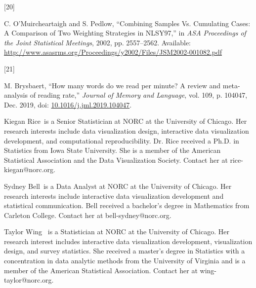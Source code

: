 \documentclass{IEEEcsmag}
\newlength{\cslhangindent}
\newlength{\csllabelwidth}
\newenvironment{CSLReferences}[2] %
 {\begin{list}{}{%
  \setlength{\itemindent}{0pt}
  \setlength{\leftmargin}{0pt}
  \setlength{\parsep}{0pt}
  \ifodd #1
   \setlength{\leftmargin}{\cslhangindent}
   \setlength{\itemindent}{-1\cslhangindent}
  \fi
  \setlength{\itemsep}{#2\baselineskip}}}
 {\end{list}}
\newcommand{\CSLLeftMargin}[1]{\parbox[t]{\csllabelwidth}{#1}}
\newcommand{\CSLRightInline}[1]{\parbox[t]{\linewidth - \csllabelwidth}{#1}\break}
\begin{document}
\begin{CSLReferences}{0}{0}
\CSLLeftMargin{{[}20{]} }%
\CSLRightInline{C. O'Muircheartaigh and S. Pedlow, {``Combining {Samples Vs}. {Cumulating Cases}: {A Comparison} of {Two Weighting Strategies} in {NLSY97},''} in \emph{{ASA Proceedings} of the {Joint Statistical Meetings}}, 2002, pp. 2557--2562. Available: \url{http://www.asasrms.org/Proceedings/y2002/Files/JSM2002-001082.pdf}}

\CSLLeftMargin{{[}21{]} }%
\CSLRightInline{M. Brysbaert, {``How many words do we read per minute? {A} review and meta-analysis of reading rate,''} \emph{Journal of Memory and Language}, vol. 109, p. 104047, Dec. 2019, doi: \href{https://doi.org/10.1016/j.jml.2019.104047}{10.1016/j.jml.2019.104047}.}

\end{CSLReferences}


\begin{IEEEbiography}{Kiegan Rice}{\,} is a Senior Statistician at NORC at the University of Chicago. Her research interests include data visualization design, interactive data visualization development, and computational reproducibility. Dr. Rice received a Ph.D. in Statistics from Iowa State University. She is a member of the American Statistical Association and the Data Visualization Society. Contact her at rice-kiegan@norc.org.%
\end{IEEEbiography}

\begin{IEEEbiography}{Sydney Bell}{\,} is a Data Analyst at NORC at the University of Chicago.  Her research interests include interactive data visualization development and statistical communication. Bell received a bachelor's degree in Mathematics from Carleton College. Contact her  at bell-sydney@norc.org.\vspace*{8pt}
\end{IEEEbiography}

\begin{IEEEbiography}{Taylor Wing} {\,} is a Statistician at NORC at the University of Chicago. Her research interest includes interactive data visualization development, visualization design, and survey statistics. She received a master’s degree in Statistics with a concentration in data analytic methods from the University of Virginia and is a member of the American Statistical Association. Contact her at wing-taylor@norc.org.\vspace*{8pt}
\end{IEEEbiography}
\end{document}
